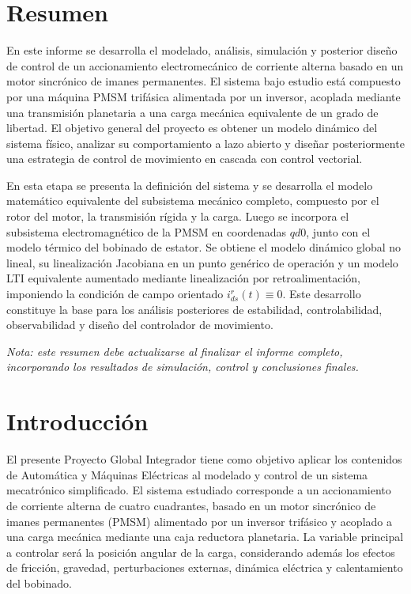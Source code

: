 \documentclass[10pt,a4paper]{article}
\begin{document}
\section*{Resumen}

En este informe se desarrolla el modelado, análisis, simulación y posterior diseño de control de un accionamiento electromecánico de corriente alterna basado en un motor sincrónico de imanes permanentes. El sistema bajo estudio está compuesto por una máquina PMSM trifásica alimentada por un inversor, acoplada mediante una transmisión planetaria a una carga mecánica equivalente de un grado de libertad. El objetivo general del proyecto es obtener un modelo dinámico del sistema físico, analizar su comportamiento a lazo abierto y diseñar posteriormente una estrategia de control de movimiento en cascada con control vectorial.

En esta etapa se presenta la definición del sistema y se desarrolla el modelo matemático equivalente del subsistema mecánico completo, compuesto por el rotor del motor, la transmisión rígida y la carga. Luego se incorpora el subsistema electromagnético de la PMSM en coordenadas \(qd0\), junto con el modelo térmico del bobinado de estator. Se obtiene el modelo dinámico global no lineal, su linealización Jacobiana en un punto genérico de operación y un modelo LTI equivalente aumentado mediante linealización por retroalimentación, imponiendo la condición de campo orientado \(i_{ds}^{r}(t)\equiv0\). Este desarrollo constituye la base para los análisis posteriores de estabilidad, controlabilidad, observabilidad y diseño del controlador de movimiento.

\textit{Nota: este resumen debe actualizarse al finalizar el informe completo, incorporando los resultados de simulación, control y conclusiones finales.}

\section{Introducción}

El presente Proyecto Global Integrador tiene como objetivo aplicar los contenidos de Automática y Máquinas Eléctricas al modelado y control de un sistema mecatrónico simplificado. El sistema estudiado corresponde a un accionamiento de corriente alterna de cuatro cuadrantes, basado en un motor sincrónico de imanes permanentes (PMSM) alimentado por un inversor trifásico y acoplado a una carga mecánica mediante una caja reductora planetaria. La variable principal a controlar será la posición angular de la carga, considerando además los efectos de fricción, gravedad, perturbaciones externas, dinámica eléctrica y calentamiento del bobinado.
\end{document}
